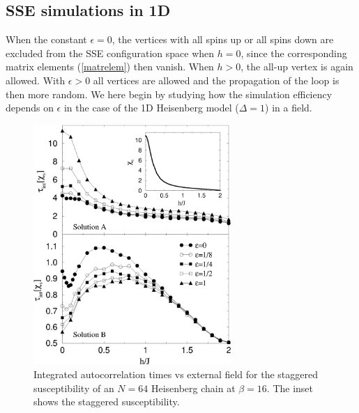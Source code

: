 \documentclass[10pt,pre,aps,twocolumn,showpacs,superscriptaddress,
floatfix]{revtex4}
\begin{document}
\subsection{SSE simulations in 1D}

When the constant $\epsilon=0$, the vertices with all spins up or all spins 
down are excluded from the SSE configuration space when $h=0$, since
the corresponding matrix elements (\ref{matrelem}) then vanish. When $h > 0$, 
the all-up vertex is again allowed. With $\epsilon > 0$ all vertices are
allowed and the propagation of the loop is then more random. We here begin 
by studying how the simulation efficiency depends on $\epsilon$ in the case
of the 1D Heisenberg model ($\Delta=1$) in a field.

\begin{figure}
\includegraphics[clip,width=7.5cm]{fig14.eps}
\caption{Integrated autocorrelation times vs external field for the 
staggered susceptibility of an $N=64$ Heisenberg chain at $\beta=16$.
The inset shows the staggered susceptibility.}
\label{l64_x}
\end{figure}
\end{document}
